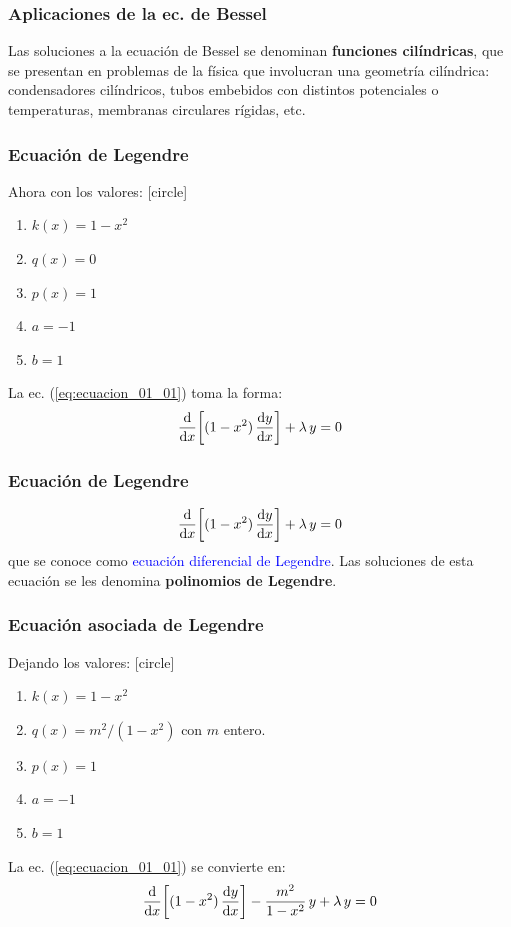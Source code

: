 \documentclass[12pt]{beamer}
\begin{document}
\begin{frame}
\frametitle{Aplicaciones de la ec. de Bessel}
Las soluciones a la ecuación de Bessel se denominan \textbf{funciones cilíndricas}, que se presentan en problemas de la física que involucran una geometría cilíndrica: condensadores cilíndricos, tubos embebidos con distintos potenciales o temperaturas, membranas circulares rígidas, etc.
\end{frame}
\begin{frame}
\frametitle{Ecuación de Legendre}
Ahora con los valores:
[circle]
\begin{enumerate}[<+->]
\item $k(x) = 1 - x^{2}$
\item $q(x) = 0$
\item $p(x) = 1$
\item $a = -1$
\item $b = 1$
\end{enumerate}
\pause
La ec. (\ref{eq:ecuacion_01_01}) toma la forma:
\begin{align}
\dv{x} \bigg[ (1 - x^{2}) \, \dv{y}{x} \bigg] + \lambda \, y = 0
\label{eq:ecuacion_01_05}
\end{align}
\end{frame}
\begin{frame}
\frametitle{Ecuación de Legendre}
\begin{align*}
\dv{x} \bigg[ (1 - x^{2}) \, \dv{y}{x} \bigg] + \lambda \, y = 0
\end{align*}
\pause
que se conoce como \textcolor{blue}{ecuación diferencial de Legendre}. \pause Las soluciones de esta ecuación se les denomina \textbf{polinomios de Legendre}.
\end{frame}
\begin{frame}
\frametitle{Ecuación asociada de Legendre}
Dejando los valores:
[circle]
\begin{enumerate}[<+->]
\item $k(x) = 1 - x^{2}$
\item $q(x) = m^{2}/(1 - x^{2})$ con $m$ entero.
\item $p(x) = 1$
\item $a = -1$
\item $b = 1$
\end{enumerate}
\pause
La ec. (\ref{eq:ecuacion_01_01}) se convierte en:
\begin{align}
\dv{x} \bigg[ (1 - x^{2}) \, \dv{y}{x} \bigg] - \dfrac{m^{2}}{1 - x^{2}} \, y + \lambda \, y = 0
\label{eq:ecuacion_01_06}
\end{align}
\end{frame}
\end{document}
